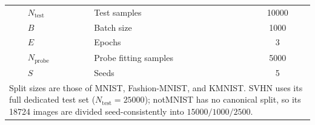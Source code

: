 \begin{longtable}{m{2.4cm}m{1.9cm}m{4.3cm}m{2.1cm}m{2.1cm}}
  & $N_{\text{test}}$ & Test samples & \multicolumn{2}{c}{10000} \\
  & $B$               & Batch size & \multicolumn{2}{c}{1000} \\
  & $E$               & Epochs & \multicolumn{2}{c}{3} \\
  & $N_{\text{probe}}$ & Probe fitting samples & \multicolumn{2}{c}{5000} \\
  & $S$               & Seeds & \multicolumn{2}{c}{5} \\
\bottomrule
\multicolumn{5}{p{12.8cm}}{\footnotesize Split sizes are those of MNIST, Fashion-MNIST,
and KMNIST. SVHN uses its full dedicated test set ($N_{\text{test}} = 25000$); notMNIST
has no canonical split, so its 18724 images are divided seed-consistently into
$15000 / 1000 / 2500$.} \\
\end{longtable}
